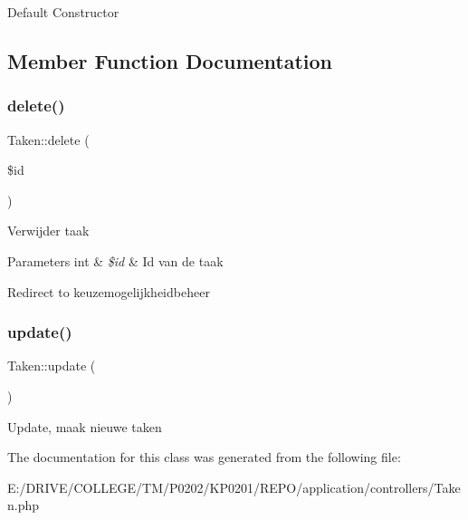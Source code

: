 Default Constructor

\subsection{Member Function Documentation}
\mbox{\label{class_taken_a696d6a2a1c533a261e2f0e29a4537662}} 
\subsubsection{\texorpdfstring{delete()}{delete()}}
{\footnotesize\ttfamily Taken\+::delete (\begin{DoxyParamCaption}\item[{}]{\$id }\end{DoxyParamCaption})}

Verwijder taak 
\begin{DoxyParams}[1]{Parameters}
int & {\em \$id} & Id van de taak \\
\hline
\end{DoxyParams}
Redirect to keuzemogelijkheidbeheer \mbox{\label{class_taken_a2c370b12ed83ff4617224675576b47a1}} 
\subsubsection{\texorpdfstring{update()}{update()}}
{\footnotesize\ttfamily Taken\+::update (\begin{DoxyParamCaption}{ }\end{DoxyParamCaption})}

Update, maak nieuwe taken 

The documentation for this class was generated from the following file\+:\begin{DoxyCompactItemize}
\item 
E\+:/\+D\+R\+I\+V\+E/\+C\+O\+L\+L\+E\+G\+E/\+T\+M/\+P0202/\+K\+P0201/\+R\+E\+P\+O/application/controllers/Taken.\+php\end{DoxyCompactItemize}
